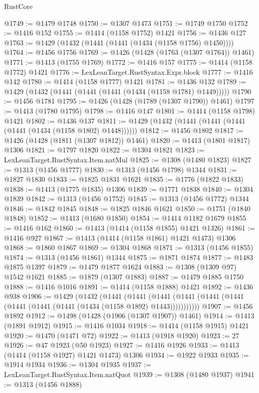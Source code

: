 \begin{lexlean}{RustCore}
\begin{coremodule}
@1749 := @1479 @1748
@1750 := @1307 @1473
@1751 := @1749 @1750
@1752 := @1416 @152
@1755 := @1414 (@1158 @1752) @1421
@1756 := @1436 @127
@1763 := @1429 (@1432 (@1441 (@1441 (@1434 (@1158 @1756) @1450))))
@1764 := @1456 @1756
@1769 := @1426 (@1428 (@1763 (@1307 @1764)) @1461)
@1771 := @1413 (@1755 @1769)
@1772 := @1416 @157
@1775 := @1414 (@1158 @1772) @1421
@1776 := LexLeanTarget.RustSyntax.Expr.block
@1777 := @1416 @142
@1780 := @1414 (@1158 @1777) @1421
@1781 := @1436 @132
@1789 := @1429 (@1432 (@1441 (@1441 (@1441 (@1434 (@1158 @1781) @1449)))))
@1790 := @1456 @1781
@1795 := @1426 (@1428 (@1789 (@1307 @1790)) @1461)
@1797 := @1413 (@1780 @1795)
@1798 := @1416 @147
@1801 := @1414 (@1158 @1798) @1421
@1802 := @1436 @137
@1811 := @1429 (@1432 (@1441 (@1441 (@1441 (@1441 (@1434 (@1158 @1802) @1448))))))
@1812 := @1456 @1802
@1817 := @1426 (@1428 (@1811 (@1307 @1812)) @1461)
@1820 := @1413 (@1801 @1817) @1306
@1821 := @1797 @1820
@1822 := @1304 @1821
@1823 := LexLeanTarget.RustSyntax.Item.natMul
@1825 := @1308 (@1480 @1823)
@1827 := @1313 (@1456 @1777)
@1830 := @1313 (@1456 @1798) @1344
@1831 := @1827 @1830
@1833 := @1825 @1831 @1621
@1835 := @1776 (@1822 @1833)
@1838 := @1413 (@1775 @1835) @1306
@1839 := @1771 @1838
@1840 := @1304 @1839
@1842 := @1313 (@1456 @1752)
@1845 := @1313 (@1456 @1772) @1344
@1846 := @1842 @1845
@1848 := @1825 @1846 @1621
@1850 := @1751 (@1840 @1848)
@1852 := @1413 (@1680 @1850)
@1854 := @1414 @1182 @1679
@1855 := @1416 @162
@1860 := @1413 (@1414 (@1158 @1855) @1421 @1326)
@1861 := @1416 @927
@1867 := @1413 (@1414 (@1158 @1861) @1421 @1473) @1306
@1868 := @1860 @1867
@1869 := @1304 @1868
@1871 := @1313 (@1456 @1855)
@1874 := @1313 (@1456 @1861) @1344
@1875 := @1871 @1874
@1877 := @1483 @1875 @1397
@1879 := @1479 @1877 @1624
@1883 := @1308 (@1309 @97) @1542 @1621
@1885 := @1879 (@1307 @1883)
@1887 := @1479 @1885 @1750
@1888 := @1416 @1016
@1891 := @1414 (@1158 @1888) @1421
@1892 := @1436 @938
@1906 := @1429
    (@1432
      (@1441
        (@1441
          (@1441 (@1441 (@1441 (@1441 (@1441 (@1441 (@1441 (@1434 (@1158 @1892) @1443)))))))))))
@1907 := @1456 @1892
@1912 := @1498 (@1428 (@1906 (@1307 @1907)) @1461)
@1914 := @1413 (@1891 @1912)
@1915 := @1416 @1034
@1918 := @1414 (@1158 @1915) @1421
@1920 := @1470 (@1471 @72)
@1922 := @1413 (@1918 @1920)
@1923 := 27
@1926 := @47 @1923 (@50 @1923)
@1927 := @1416 @1926
@1933 := @1413 (@1414 (@1158 @1927) @1421 @1473) @1306
@1934 := @1922 @1933
@1935 := @1914 @1934
@1936 := @1304 @1935
@1937 := LexLeanTarget.RustSyntax.Item.natQuot
@1939 := @1308 (@1480 @1937)
@1941 := @1313 (@1456 @1888)

\end{coremodule}
\end{lexlean}
